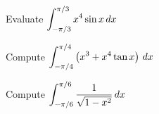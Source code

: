\documentclass[notes]{subfiles}
\begin{document}
		\begin{ex}
			Evaluate \(\displaystyle \int_{-\pi/3}^{\pi/3} x^4\sin x\,dx\)
		\end{ex}
			
		\begin{ex}
			Compute \(\displaystyle \int_{-\pi/4}^{\pi/4} \left( x^3 + x^4 \tan x\right)\, dx\)
		\end{ex}
			
		\begin{ex}
			Compute \(\displaystyle \int_{-\pi/6}^{\pi/6} \dfrac{1}{\sqrt{1-x^2}}\, dx\)
		\end{ex}
			
	
			
	\clearpage			
\end{document}
